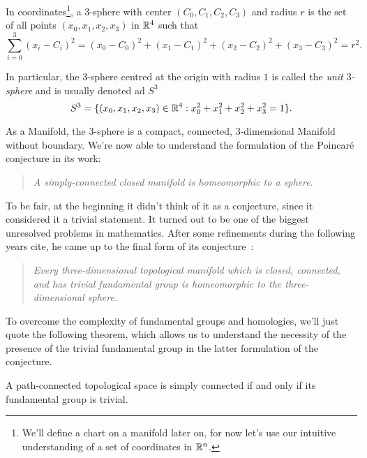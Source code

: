 \begin{definition}[$3$-sphere]
    In coordinates\footnote{We'll define a chart on a manifold later on, for now let's use our intuitive understanding of a set of coordinates in $\mathbb{R}^n$.}, a $3$-sphere with center $(C_0,C_1,C_2,C_3)$ and radius $r$ is the set of all points $(x_0,x_1,x_2,x_3)$ in $\mathbb{R}^4$ such that
    \begin{equation}
        \sum_{i=0}^3 (x_i - C_i)^2 = (x_0 - C_0)^2 + (x_1 - C_1)^2 + (x_2 - C_2)^2 + (x_3 - C_3)^2 = r^2.
    \end{equation}

    In particular, the $3$-sphere centred at the origin with radius $1$ is called the \emph{unit $3$-sphere} and is usually denoted ad $S^3$
    \begin{equation}
        S^3 = \{ (x_0,x_1,x_2,x_3) \in \mathbb{R}^4 : x_0^2 + x_1^2 + x_2^2 + x_3^2 = 1 \} .
    \end{equation}
\end{definition}

As a Manifold, the $3$-sphere  is a compact, connected, $3$-dimensional Manifold without boundary. We're now able to understand the formulation of the Poincaré conjecture in its work:

\begin{quotation}
    \noindent \emph{A simply-connected closed manifold is homeomorphic to a sphere}.
\end{quotation}

To be fair, at the beginning it didn't think of it as a conjecture, since it considered it a trivial statement. It turned out to be one of the biggest unresolved problems in mathematics. After some refinements during the following years \color{red}cite\color{black}, he came up to the final form of its conjecture~\cite{poincare:complement}:

\begin{quotation}
    \noindent \emph{Every three-dimensional topological manifold which is closed, connected, and has trivial fundamental group is homeomorphic to the three-dimensional sphere.}
\end{quotation}

To overcome the complexity of fundamental groups and homologies, we'll just quote the following theorem, which allows us to understand the necessity of the presence of the trivial fundamental group in the latter formulation of the conjecture.

\begin{theorem}
    A path-connected topological space is simply connected if and only if its fundamental group is trivial.
\end{theorem}

